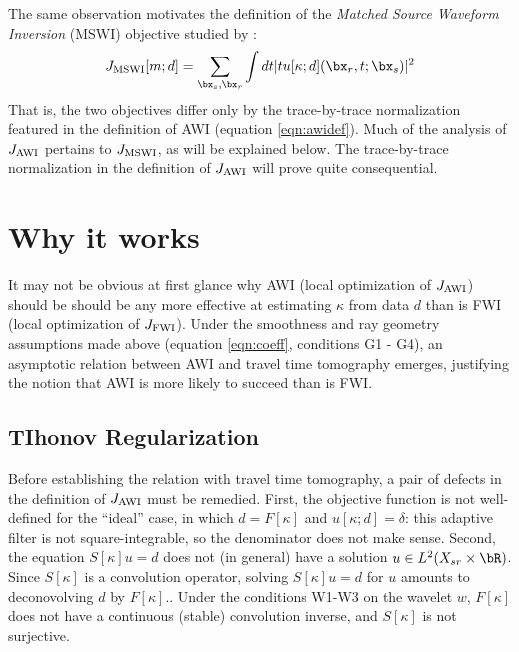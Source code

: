 The same observation motivates the definition of the {\em Matched
  Source Waveform Inversion} (MSWI) objective studied by
\cite{HuangSymes2015SEG,HuangSymes:Geo17}:
\begin{equation}
  \label{eqn:mswidef}
  J_{\rm MSWI}[m;d] = \sum_{\bx_s,\bx_r} \int dt |tu[\kappa;d](\bx_r,t;\bx_s)|^2
\end{equation}
That is, the two objectives differ only by the trace-by-trace
normalization featured in the definition of AWI (equation
\ref{eqn:awidef}). Much of the analysis of $J_{\rm AWI}$ pertains to
$J_{\rm MSWI}$, as will be explained below.
The trace-by-trace normalization in the definition of $J_{\rm AWI}$
will prove quite consequential.

\section{Why it works}

It may not be obvious at first glance why AWI (local optimization of
$J_{\rm AWI}$) should be should be any more effective at estimating
$\kappa$ from data $d$ than is FWI (local
optimization of $J_{\rm FWI}$). Under the smoothness and ray geometry assumptions made above (equation
\ref{eqn:coeff}, conditions G1 - G4), an asymptotic relation
between AWI and travel time tomography emerges, justifying the notion
that AWI is more likely to succeed than is FWI.

\subsection{TIhonov Regularization}
Before establishing the relation with travel time tomography, a pair of defects in the definition
of $J_{\rm AWI}$ must be remedied. First, the objective function is
not well-defined for the ``ideal'' case, in which $d = F[\kappa]$ and
$u[\kappa;d]=\delta$: this adaptive filter is not square-integrable, so the
denominator does not make sense. Second, the equation $S[\kappa]u=d$ does
not (in general) have a solution $u \in L^2(X_{sr} \times \bR)$. Since $S[\kappa]$ is a convolution operator, solving
$S[\kappa]u=d$ for $u$ amounts to deconovolving $d$ by $F[\kappa]$..
Under the conditions W1-W3 on the wavelet $w$, $F[\kappa]$ does
not have a continuous (stable) convolution inverse, and
$S[\kappa]$ is not surjective.

